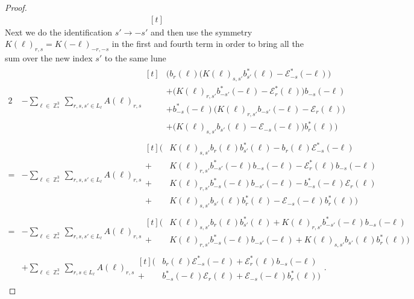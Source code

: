 \documentclass[sn-mathphys,Numbered, a4paper ,nocrop]{sn-jnl}%
\DeclareMathOperator{\Z}{\mathbb{Z}}
\theoremstyle{plain}
\theoremstyle{definition}
\theoremstyle{remark}
\theoremstyle{plain}
\theoremstyle{definition}
\theoremstyle{remark}
\begin{document}
\begin{proof}
\begin{equation}
\begin{aligned}[t]
    \end{aligned}
\end{equation}
Next we do the identification $s'\rightarrow -s'$ and then use the symmetry $K(\ell)_{r,s} = K(-\ell)_{-r,-s}$ in the first and fourth term in order to bring all the sum over the new index $s'$ to the same lune
\begin{alignat}{2}
    &-\sum\limits_{\ell \in \Z^3_*}\sum\limits_{r,s,s' \in L_{\ell}}A(\ell)_{r,s}\begin{aligned}[t]
        &\Bigg(b_{r}(\ell)\Big(K(\ell)_{s,s'}b^*_{s'}(\ell) - \mathcal{E}^*_{-s}(-\ell)\Big)\\ &+ \Big(K(\ell)_{r,s'}b^*_{-s'}(-\ell) - \mathcal{E}^*_{r}(\ell)\Big)b_{-s}(-\ell)\\&+ b^*_{-s}(-\ell)\Big(K(\ell)_{r,s'}b_{-s'}(-\ell) - \mathcal{E}_{r}(\ell)\Big)\\ &+ \Big(K(\ell)_{s,s'}b_{s'}(\ell) - \mathcal{E}_{-s}(-\ell)\Big)b^*_{r}(\ell) \Bigg)
    \end{aligned}\\
    = &-\sum\limits_{\ell \in \Z^3_*}\sum\limits_{r,s,s' \in L_{\ell}}A(\ell)_{r,s}\begin{aligned}[t]
        \Big(&K(\ell)_{s,s'}b_{r}(\ell)b^*_{s'}(\ell) - b_{r}(\ell) \mathcal{E}^*_{-s}(-\ell)\\ + &K(\ell)_{r,s'}b^*_{-s'}(-\ell)b_{-s}(-\ell) - \mathcal{E}^*_{r}(\ell)b_{-s}(-\ell)\\+& K(\ell)_{r,s'}b^*_{-s}(-\ell)b_{-s'}(-\ell) -b^*_{-s}(-\ell) \mathcal{E}_{r}(\ell)\\ + &K(\ell)_{s,s'}b_{s'}(\ell)b^*_{r}(\ell) - \mathcal{E}_{-s}(-\ell)b^*_{r}(\ell) \Big)
    \end{aligned}\\
     =&-\sum\limits_{\ell \in \Z^3_*}\sum\limits_{r,s,s' \in L_{\ell}}A(\ell)_{r,s}\begin{aligned}[t]
        \Big(&K(\ell)_{s,s'}b_{r}(\ell)b^*_{s'}(\ell)  + K(\ell)_{r,s'}b^*_{-s'}(-\ell)b_{-s}(-\ell) \\+& K(\ell)_{r,s'}b^*_{-s}(-\ell)b_{-s'}(-\ell) + K(\ell)_{s,s'}b_{s'}(\ell)b^*_{r}(\ell)\Big)
        \end{aligned}\nonumber\\
    &+\sum\limits_{\ell \in \Z^3_*}\sum\limits_{r,s \in L_{\ell}}A(\ell)_{r,s}\begin{aligned}[t]\Big(&b_{r}(\ell) \mathcal{E}^*_{-s}(-\ell) +\mathcal{E}^*_{r}(\ell)b_{-s}(-\ell) \\+&b^*_{-s}(-\ell) \mathcal{E}_{r}(\ell)+ \mathcal{E}_{-s}(-\ell)b^*_{r}(\ell) \Big)\end{aligned}.\label{eq:unrefcomerrq2k}

\end{alignat}
\end{proof}
\end{document}
